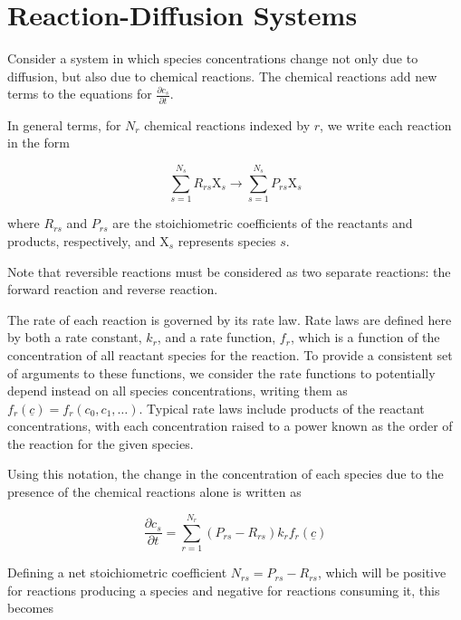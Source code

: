 
\section{Reaction-Diffusion Systems}\label{sec:reactionterms}

Consider a system in which species concentrations change not only due to diffusion,
but also due to chemical reactions.
The chemical reactions add new terms to the equations for $\frac{\partial c_s}{\partial t}$.

In general terms, for $N_r$ chemical reactions indexed by $r$,
we write each reaction in the form

\begin{equation}
\sum_{s=1}^{N_s} R_{rs} \mathrm{X}_s \longrightarrow \sum_{s=1}^{N_s} P_{rs} \mathrm{X}_s
\end{equation}

where $R_{rs}$ and $P_{rs}$ are the stoichiometric coefficients
of the reactants and products, respectively,
and $\mathrm{X}_s$ represents species $s$.

Note that reversible reactions must be considered as two separate reactions:
the forward reaction and reverse reaction.

The rate of each reaction is governed by its rate law.
Rate laws are defined here by both a rate constant, $k_r$,
and a rate function, $f_r$, which is a function of the concentration
of all reactant species for the reaction.
To provide a consistent set of arguments to these functions,
we consider the rate functions to potentially depend instead
on all species concentrations,
writing them as $f_r\left(\underline{c}\right) = f_r\left(c_0, c_1, \ldots \right)$.
Typical rate laws include products of the reactant concentrations,
with each concentration raised to a power known as the order of the reaction
for the given species.

Using this notation, the change in the concentration of each species
due to the presence of the chemical reactions alone is written as

\begin{equation}
\frac{\partial c_s}{\partial t} = 
\sum_{r=1}^{N_r} \left( P_{rs} - R_{rs} \right) k_r f_r\left(\underline{c}\right)
\end{equation}

Defining a net stoichiometric coefficient $N_{rs} = P_{rs} - R_{rs}$,
which will be positive for reactions producing a species and negative
for reactions consuming it, this becomes

